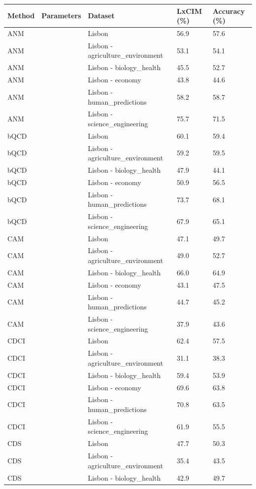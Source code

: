 \begin{tabular}{lllll}
\toprule
Method & Parameters & Dataset & LxCIM (\%) & Accuracy (\%) \\
\midrule
ANM &  & Lisbon & 56.9 & 57.6 \\
ANM &  & Lisbon - agriculture\_environment & 53.1 & 54.1 \\
ANM &  & Lisbon - biology\_health & 45.5 & 52.7 \\
ANM &  & Lisbon - economy & 43.8 & 44.6 \\
ANM &  & Lisbon - human\_predictions & 58.2 & 58.7 \\
ANM &  & Lisbon - science\_engineering & 75.7 & 71.5 \\
bQCD &  & Lisbon & 60.1 & 59.4 \\
bQCD &  & Lisbon - agriculture\_environment & 59.2 & 59.5 \\
bQCD &  & Lisbon - biology\_health & 47.9 & 44.1 \\
bQCD &  & Lisbon - economy & 50.9 & 56.5 \\
bQCD &  & Lisbon - human\_predictions & 73.7 & 68.1 \\
bQCD &  & Lisbon - science\_engineering & 67.9 & 65.1 \\
CAM &  & Lisbon & 47.1 & 49.7 \\
CAM &  & Lisbon - agriculture\_environment & 49.0 & 52.7 \\
CAM &  & Lisbon - biology\_health & 66.0 & 64.9 \\
CAM &  & Lisbon - economy & 43.1 & 47.5 \\
CAM &  & Lisbon - human\_predictions & 44.7 & 45.2 \\
CAM &  & Lisbon - science\_engineering & 37.9 & 43.6 \\
CDCI &  & Lisbon & 62.4 & 57.5 \\
CDCI &  & Lisbon - agriculture\_environment & 31.1 & 38.3 \\
CDCI &  & Lisbon - biology\_health & 59.4 & 53.9 \\
CDCI &  & Lisbon - economy & 69.6 & 63.8 \\
CDCI &  & Lisbon - human\_predictions & 70.8 & 63.5 \\
CDCI &  & Lisbon - science\_engineering & 61.9 & 55.5 \\
CDS &  & Lisbon & 47.7 & 50.3 \\
CDS &  & Lisbon - agriculture\_environment & 35.4 & 43.5 \\
CDS &  & Lisbon - biology\_health & 42.9 & 49.7 \\

\end{tabular}

